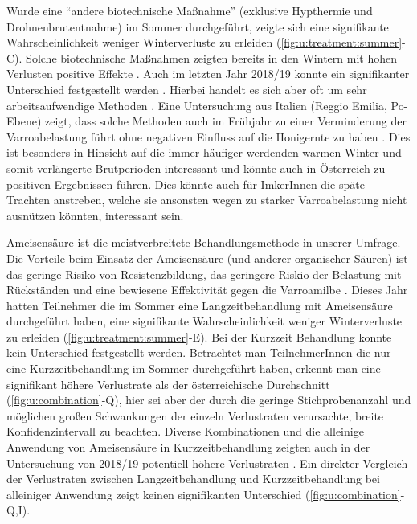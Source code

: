 Wurde eine \enquote{andere biotechnische Maßnahme} (exklusive Hypthermie und Drohnenbrutentnahme) im Sommer durchgeführt, zeigte sich eine signifikante Wahrscheinlichkeit weniger Winterverluste zu erleiden (\cref{fig:u:treatment:summer}-C). Solche biotechnische Maßnahmen zeigten bereits in den Wintern mit hohen Verlusten positive Effekte \citep{crailsheim2018}. Auch im letzten Jahr 2018/19 konnte ein signifikanter Unterschied festgestellt werden \citep{oberreiter2020}. Hierbei handelt es sich aber oft um sehr arbeitsaufwendige Methoden \citep{rosenkranz2010}. Eine Untersuchung aus Italien (Reggio Emilia, Po-Ebene) zeigt, dass solche Methoden auch im Frühjahr zu einer Verminderung der Varroabelastung führt ohne negativen Einfluss auf die Honigernte zu haben \citep{lodesani2019}. Dies ist besonders in Hinsicht auf die immer häufiger werdenden warmen Winter und somit verlängerte Brutperioden interessant und könnte auch in Österreich zu positiven Ergebnissen führen. Dies könnte auch für ImkerInnen die späte Trachten anstreben, welche sie ansonsten wegen zu starker Varroabelastung nicht ausnützen könnten, interessant sein.

\label{sss:AS:U}

Ameisensäure ist die meistverbreitete Behandlungsmethode in unserer Umfrage. Die Vorteile beim Einsatz der Ameisensäure (und anderer organischer Säuren) ist das geringe Risiko von Resistenzbildung, das geringere Riskio der Belastung mit Rückständen und eine bewiesene Effektivität gegen die Varroamilbe \citep{rosenkranz2010, noel2020}.
\newline
Dieses Jahr hatten Teilnehmer die im Sommer eine Langzeitbehandlung mit Ameisensäure durchgeführt haben, eine signifikante Wahrscheinlichkeit weniger Winterverluste zu erleiden (\cref{fig:u:treatment:summer}-E). Bei der Kurzzeit Behandlung konnte kein Unterschied festgestellt werden. Betrachtet man TeilnehmerInnen die nur eine Kurzzeitbehandlung im Sommer durchgeführt haben, erkennt man eine signifikant höhere Verlustrate als der österreichische Durchschnitt (\cref{fig:u:combination}-Q), hier sei aber der durch die geringe Stichprobenanzahl und möglichen großen Schwankungen der einzeln Verlustraten verursachte, breite Konfidenzintervall zu beachten. Diverse Kombinationen und die alleinige Anwendung von Ameisensäure in Kurzzeitbehandlung zeigten auch in der Untersuchung von 2018/19 potentiell höhere Verlustraten \citep{oberreiter2020}. Ein direkter Vergleich der Verlustraten zwischen Langzeitbehandlung und Kurzzeitbehandlung bei alleiniger Anwendung zeigt keinen signifikanten Unterschied (\cref{fig:u:combination}-Q,I).

